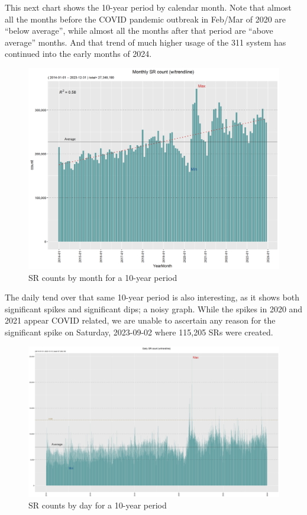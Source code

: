 \documentclass[12pt, titlepage]{article}
\begin{document}
This next chart shows the 10-year period by calendar month. Note that almost all the months before the COVID pandemic outbreak in Feb/Mar
of 2020 are ``below average'', while almost all the months after that period are ``above average'' months. And that trend of much higher usage
of the 311 system has continued into the early months of 2024.

\begin{figure}[htbp]
  \centering
  \includegraphics[scale=0.65]{Monthly.png}
  \caption{SR counts by month for a 10-year period}
  \label{fig:monthly-counts}
\end{figure}

The daily tend over that same 10-year period is also interesting, as it shows both significant spikes
and significant dips; a noisy graph. While the spikes in 2020 and 2021 appear COVID related, we are unable to 
ascertain any reason for the significant spike on Saturday, 2023-09-02 where 115,205 SRs were created.

\begin{figure}[htbp]
  \centering
  \includegraphics[scale=0.3]{Daily.png}
  \caption{SR counts by day for a 10-year period}
  \label{fig:daily-counts}
\end{figure}
\end{document}
